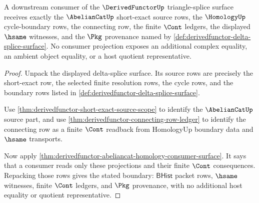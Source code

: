 \begin{theorem}\label{thm:derivedfunctor-triangle-splice-consumer-boundary}
A downstream consumer of the $\DerivedFunctorUp$ triangle-splice surface receives exactly the $\AbelianCatUp$ short-exact source rows, the $\HomologyUp$ cycle-boundary rows, the connecting row, the finite $\Cont$ ledgers, the displayed $\hsame$ witnesses, and the $\Pkg$ provenance named by \autoref{def:derivedfunctor-delta-splice-surface}. No consumer projection exposes an additional complex equality, an ambient object equality, or a host quotient representative.
\end{theorem}
\begin{proof}
Unpack the displayed delta-splice surface. Its source rows are precisely the short-exact row, the selected finite resolution rows, the cycle rows, and the boundary rows listed in \autoref{def:derivedfunctor-delta-splice-surface}.

Use \autoref{thm:derivedfunctor-short-exact-source-scope} to identify the $\AbelianCatUp$ source part, and use \autoref{thm:derivedfunctor-connecting-row-ledger} to identify the connecting row as a finite $\Cont$ readback from HomologyUp boundary data and $\hsame$ transports.

Now apply \autoref{thm:derivedfunctor-abeliancat-homology-consumer-surface}. It says that a consumer reads only these projections and their finite $\Cont$ consequences. Repacking those rows gives the stated boundary: $\mathsf{BHist}$ packet rows, $\hsame$ witnesses, finite $\Cont$ ledgers, and $\Pkg$ provenance, with no additional host equality or quotient representative.
\end{proof}

